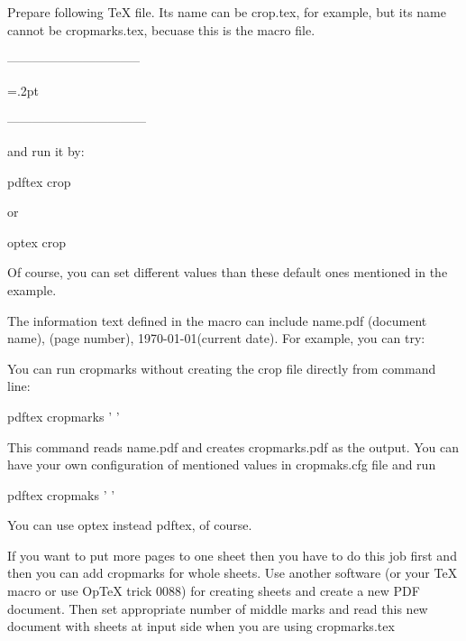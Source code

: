 Prepare following TeX file. Its name can be crop.tex, for example, but its
name cannot be cropmarks.tex, becuase this is the macro file.

--------------------------------



\def\document{name} %
\def\info{}         %

\hmargin=10mm  %
\vmargin=10mm  %
\mlenght=5mm   %
\gap=2mm       %
\mthick=.2pt   %
\overlap=0mm   %
{}     %

\docropmarks   %

---------------------------------

and run it by:

   pdftex crop

or

   optex crop

Of course, you can set different values than these default ones mentioned
in the example.

The information text defined in the \info macro can include \document.pdf
(document name), \folio (page number), \today (current date). For example,
you can try:

   \def\info{\tt [\document.pdf] -- \today\ -- page: \folio}

You can run cropmarks without creating the crop file directly from command line:

   pdftex cropmarks '\def\document{name} \docropmarks'

This command reads name.pdf and creates cropmarks.pdf as the output.
You can have your own configuration of mentioned values in cropmaks.cfg file 
and run

   pdftex cropmaks ' \def\document{name} \docropmarks'

You can use optex instead pdftex, of course.

If you want to put more pages to one sheet then you have to do this job
first and then you can add cropmarks for whole sheets. Use another software
(or your TeX macro or use OpTeX trick 0088) for creating sheets and create a
new PDF document. Then set appropriate number of middle marks and read this
new document with sheets at input side when you are using cropmarks.tex

